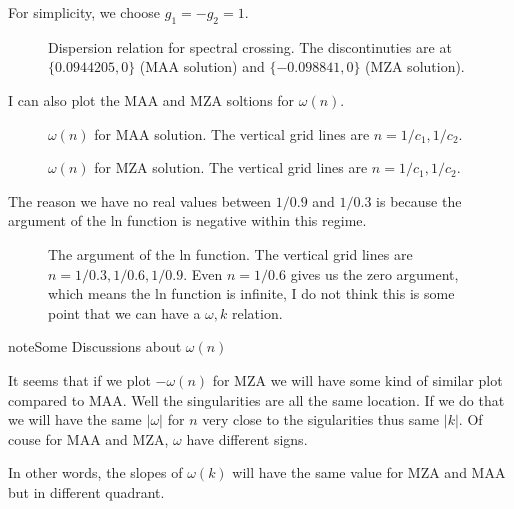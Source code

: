 \documentclass[letterpaper,12pt,english]{sphinxmanual}
\begin{document}
For simplicity, we choose \(g_1=-g_2=1\).
\begin{figure}[htbp]
\centering
\capstart

\noindent{}
\caption{Dispersion relation for spectral crossing. The discontinuties are at \(\{ 0.0944205, 0 \}\) (MAA solution) and \(\{  -0.098841, 0 \}\) (MZA solution).}\label{\detokenize{collective/dispersion-relation:id11}}\end{figure}

I can also plot the MAA and MZA soltions for \(\omega(n)\).
\begin{figure}[htbp]
\centering
\capstart

\noindent{}
\caption{\(\omega(n)\) for MAA solution. The vertical grid lines are \(n=1/c_1, 1/c_2\).}\label{\detokenize{collective/dispersion-relation:id12}}\end{figure}
\begin{figure}[htbp]
\centering
\capstart

\noindent{}
\caption{\(\omega(n)\) for MZA solution. The vertical grid lines are \(n=1/c_1, 1/c_2\).}\label{\detokenize{collective/dispersion-relation:id13}}\end{figure}

The reason we have no real values between \(1/0.9\) and \(1/0.3\) is because the argument of the ln function is negative within this regime.
\begin{figure}[htbp]
\centering
\capstart

\noindent{}
\caption{The argument of the ln function. The vertical grid lines are \(n=1/0.3,1/0.6,1/0.9\). Even \(n=1/0.6\) gives us the zero argument, which means the ln function is infinite, I do not think this is some point that we can have a \(\omega,k\) relation.}\label{\detokenize{collective/dispersion-relation:id14}}\end{figure}

\begin{sphinxadmonition}{note}{Some Discussions about \(\omega(n)\)}

It seems that if we plot \(-\omega(n)\) for MZA we will have some kind of similar plot compared to MAA. Well the singularities are all the same location. If we do that we will have the same \(\lvert\omega\rvert\) for \(n\) very close to the sigularities thus same \(\lvert k\rvert\). Of couse for MAA and MZA, \(\omega\) have different signs.

In other words, the slopes of \(\omega(k)\) will have the same value for MZA and MAA but in different quadrant.
\end{sphinxadmonition}
\end{document}
